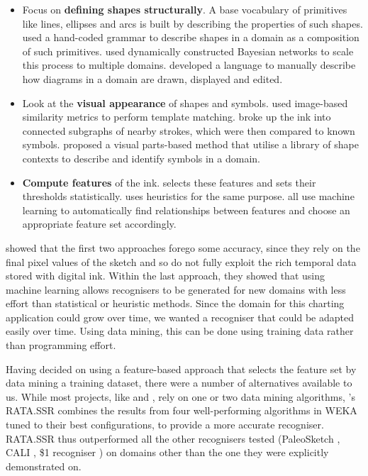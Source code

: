 	\begin{itemize}
		\item Focus on \textbf{defining shapes structurally}. A base vocabulary of primitives like lines, ellipses and arcs is built by describing the properties of such shapes. \citep{shilman_statistical_2002} used a hand-coded grammar to describe shapes in a domain as a composition of such primitives. \citep{alvarado_sketchread:_2004} used dynamically constructed Bayesian networks to scale this process to multiple domains. \citep{hammond_ladder:_2006} developed a language to manually describe how diagrams in a domain are drawn, displayed and edited. 
		\item Look at the \textbf{visual appearance} of shapes and symbols. \citep{kara_image-based_2004} used image-based similarity metrics to perform template matching. \citep{shilman_recognition_2004} broke up the ink into connected subgraphs of nearby strokes, which were then compared to known symbols. \citep{oltmans_envisioning_2007} proposed a visual parts-based method that utilise a library of shape contexts to describe and identify symbols in a domain.
		\item \textbf{Compute features} of the ink. \citep{patel_ink_2007} selects these features and sets their thresholds statistically. \citep{yu_domain-independent_2003} uses heuristics for the same purpose. \citep{chang_rata._2010,  rubine_specifying_1991, willems_iconic_2009} all use machine learning to automatically find relationships between features and choose an appropriate feature set accordingly.
	\end{itemize}		
	
	\citep{chang_rata._2010} showed that the first two approaches forego some accuracy, since they rely on the final pixel values of the sketch and so do not fully exploit the rich temporal data stored with digital ink. Within the last approach, they showed that using machine learning allows recognisers to be generated for new domains with less effort than statistical or heuristic methods. Since the domain for this charting application could grow over time, we wanted a recogniser that could be adapted easily over time. Using data mining, this can be done using training data rather than programming effort.
	
	Having decided on using a feature-based approach that selects the feature set by data mining a training dataset, there were a number of alternatives available to us. While most projects, like \citep{rubine_specifying_1991} and \citep{willems_iconic_2009}, rely on one or two data mining algorithms, \citep{chang_rata._2010}'s RATA.SSR combines the results from four well-performing algorithms in WEKA \citep{hall_weka_2009} tuned to their best configurations, to provide a more accurate recogniser. RATA.SSR thus outperformed all the other recognisers tested (PaleoSketch \citep{paulson_paleosketch:_2008}, CALI \citep{fonseca_cali:_2002}, \$1 recogniser \citep{wobbrock_gestures_2007}) on domains other than the one they were explicitly demonstrated on. 
	
